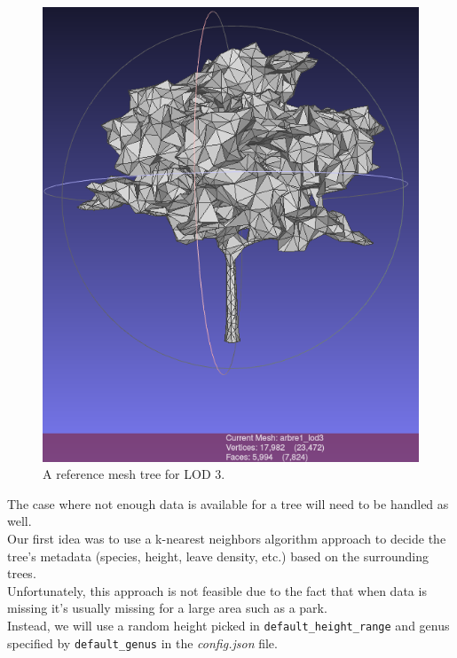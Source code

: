 \documentclass[12pt]{article}
\begin{document}
\begin{figure}[H]
\begin{minipage}{0.45\textwidth}
        \includegraphics[width=\textwidth]{images/lod3.png}
        \caption{A reference mesh tree for LOD 3.}
    \end{minipage}
\end{figure}

The case where not enough data is available for a tree will need to be handled
as well. \\
Our first idea was to use a k-nearest neighbors algorithm \cite{k-NN} approach to
decide the tree's metadata (species, height, leave density, etc.) based on the
surrounding trees. \\
Unfortunately, this approach is not feasible due to the fact that
when data is missing it's usually missing for a large area such as a park. \\
Instead, we will use a random height picked in \texttt{default\_height\_range}
and genus specified by \texttt{default\_genus} in the \textit{config.json} file.
\end{document}
